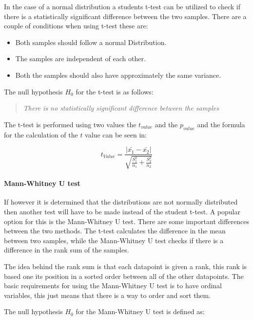 In the case of a normal distribution a students t-test can be utilized to check if there is a statistically significant difference between the two samples. There are a couple of conditions when using t-test these are:

\begin{itemize}
    \item Both samples should follow a normal Distribution.
    \item The samples are independent of each other.
    \item Both the samples should also have approximately the same variance.
\end{itemize}

The null hypothesis $H_0$ for the t-test is as follows:

\begin{quote}
    \textit{There is no statistically significant difference between the samples}    
\end{quote}

The t-test is performed using two values the $t_{value}$ and the $p_{value}$ and the formula for the calculation of the $t$ value can be seen in:

\begin{equation}
    t_{Value} = \frac{|\bar{x_1}- \bar{x_2}|}{\sqrt{\frac{S_1^2}{n_1} + \frac{S_2^2}{n_2}}}  
\end{equation}

\paragraph{Mann-Whitney U test}
If however it is determined that the distributions are not normally distributed then another test will have to be made instead of the student t-test. A popular option for this is the Mann-Whitney U test. There are some important differences between the two methods. The t-test calculates the difference in the mean between two samples, while the Mann-Whitney U test checks if there is a difference in the rank sum of the samples\cite{mann1947test}. 

The idea behind the rank sum is that each datapoint is given a rank, this rank is based one its position in a sorted order between all of the other datapoints. 
The basic requirements for using the Mann-Whitney U test is to have ordinal variables, this just means that there is a way to order and sort them.

The null hypothesis $H_0$ for the Mann-Whitney U test is defined as:

